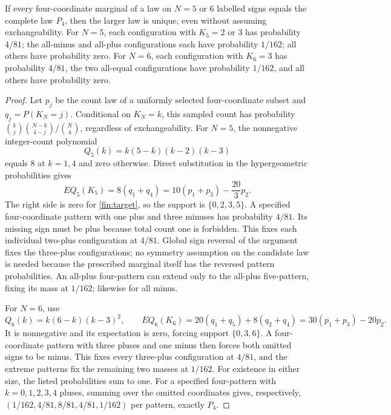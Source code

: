 \begin{theorem}
\label{fin:rigidity}
If every four-coordinate marginal of a law on \(N=5\) or \(6\)
labelled signs equals the complete law \(P_4\), then the larger law
is unique, even without assuming exchangeability.
For \(N=5\), each configuration with \(K_5=2\) or \(3\) has probability
\(4/81\); the all-minus and all-plus configurations each have probability
\(1/162\); all others have probability zero.
For \(N=6\), each configuration with \(K_6=3\) has probability \(4/81\),
the two all-equal configurations have probability \(1/162\), and all
others have probability zero.
\end{theorem}
\begin{proof}
Let \(p_j\) be the count law of a uniformly selected four-coordinate
subset and \(q_j=P(K_N=j)\).
Conditional on \(K_N=k\), this sampled count has probability
\(\binom kj\binom{N-k}{4-j}/\binom N4\), regardless of exchangeability.
For \(N=5\), the nonnegative integer-count polynomial
\[
 Q_5(k)=k(5-k)(k-2)(k-3)
\]
equals \(8\) at \(k=1,4\) and zero otherwise.  Direct substitution in
the hypergeometric probabilities gives
\[
 E Q_5(K_5)=8(q_1+q_4)
          =10(p_1+p_3)-\frac{20}{3}p_2 .
\]
The right side is zero for \eqref{fin:target}, so the support is
\(\{0,2,3,5\}\).
A specified four-coordinate pattern with one plus and three minuses
has probability \(4/81\).  Its missing sign must be plus because
total count one is forbidden.  This fixes each individual
two-plus configuration at \(4/81\).  Global sign reversal of the
argument fixes the three-plus configurations; no symmetry assumption
on the candidate law is needed because the prescribed marginal itself
has the reversed pattern probabilities.  An all-plus four-pattern
can extend only to the all-plus five-pattern, fixing its mass at
\(1/162\); likewise for all minus.

For \(N=6\), use
\[
 Q_6(k)=k(6-k)(k-3)^2,\qquad
 E Q_6(K_6)=20(q_1+q_5)+8(q_2+q_4)
          =30(p_1+p_3)-20p_2 .
\]
It is nonnegative and its expectation is zero, forcing support
\(\{0,3,6\}\).
A four-coordinate pattern with three pluses and one minus then forces
both omitted signs to be minus.  This fixes every three-plus
configuration at \(4/81\), and the extreme patterns fix the remaining
two masses at \(1/162\).
For existence in either size, the listed probabilities sum to one.
For a specified four-pattern with \(k=0,1,2,3,4\) pluses, summing over
the omitted coordinates gives, respectively,
\((1/162,4/81,8/81,4/81,1/162)\) per pattern, exactly \(P_4\).
\end{proof}

